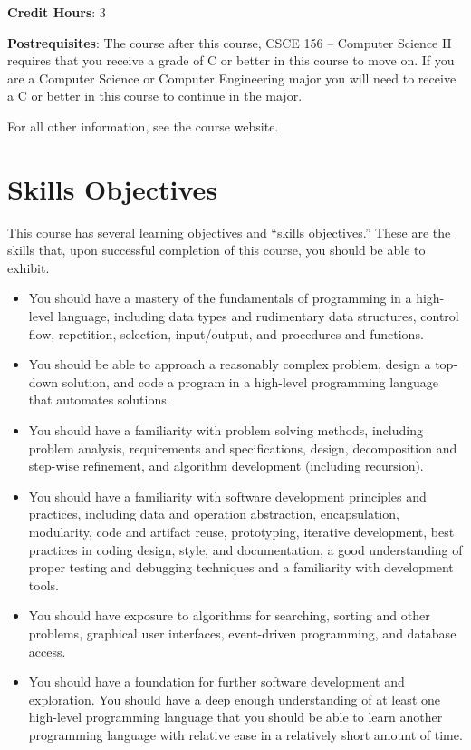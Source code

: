 \documentclass[12pt]{scrartcl}
\begin{document}
\textbf{Credit Hours}: 3

\textbf{Postrequisites}: The course after this course, CSCE 156 -- Computer 
Science II requires that you receive a grade of C or better in this course to
move on.  If you are a Computer Science or Computer Engineering major you will
need to receive a C or better in this course to continue in the major.  

For all other information, see the course website.

\section{Skills Objectives}

This course has several learning objectives and ``skills objectives.''
These are the skills that, upon successful completion of this course, 
you should be able to exhibit.

\begin{itemize}
  \item You should have a mastery of the fundamentals of programming 
  in a high-level language, including data types and rudimentary data 
  structures, control flow, repetition, selection, input/output, 
  and procedures and functions.
  \item You should be able to approach a reasonably complex problem, 
  design a top-down solution, and code a program in a high-level programming 
  language that automates solutions.
  \item You should have a familiarity with problem solving methods, 
  including problem analysis, requirements and specifications, design, 
  decomposition and step-wise refinement, and algorithm development 
  (including recursion).
  \item You should have a familiarity with software development principles 
  and practices, including data and operation abstraction, encapsulation, 
  modularity, code and artifact reuse, prototyping, iterative development, 
  best practices in coding design, style, and documentation, a good understanding
  of proper testing and debugging techniques and a familiarity with
  development tools.
  \item You should have exposure to algorithms for searching, sorting 
  and other problems, graphical user interfaces, event-driven programming, 
  and database access. 
  \item You should have a foundation for further software development and
  exploration.  You should have a deep enough understanding of at least
  one high-level programming language that you should be able to learn another
  programming language with relative ease in a relatively short amount of time.  
\end{itemize}
\end{document}

